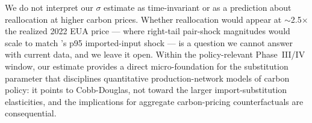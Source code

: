 We do not interpret our $\sigma$ estimate as time-invariant or as a prediction about reallocation at higher carbon prices. Whether reallocation would appear at $\sim$2.5$\times$ the realized 2022 EUA price --- where right-tail pair-shock magnitudes would scale to match \citet{peter2023}'s p95 imported-input shock --- is a question we cannot answer with current data, and we leave it open. Within the policy-relevant Phase~III/IV window, our estimate provides a direct micro-foundation for the substitution parameter that disciplines quantitative production-network models of carbon policy: it points to Cobb-Douglas, not toward the larger import-substitution elasticities, and the implications for aggregate carbon-pricing counterfactuals are consequential.
